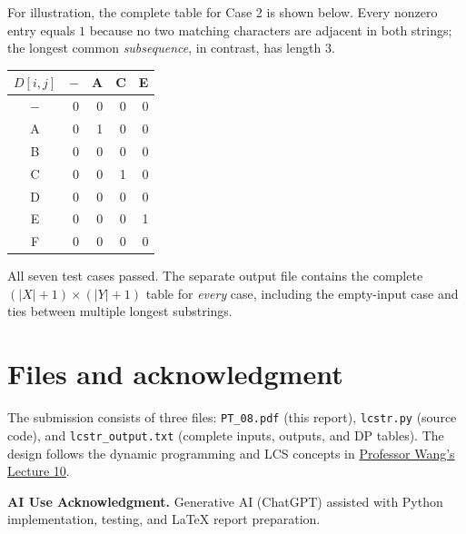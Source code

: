 \documentclass[11pt,a4paper]{article}
\newcommand{\code}[1]{\texttt{#1}}
\begin{document}
For illustration, the complete table for Case 2 is shown below. Every
nonzero entry equals $1$ because no two matching characters are adjacent in
both strings; the longest common \emph{subsequence}, in contrast, has length $3$.
\begin{center}
\small
\renewcommand{\arraystretch}{1.05}
\begin{tabular}{c|rrrr}
 $D[i,j]$ & $-$ & A & C & E\\\hline
 $-$ & 0 & 0 & 0 & 0\\
 A & 0 & 1 & 0 & 0\\
 B & 0 & 0 & 0 & 0\\
 C & 0 & 0 & 1 & 0\\
 D & 0 & 0 & 0 & 0\\
 E & 0 & 0 & 0 & 1\\
 F & 0 & 0 & 0 & 0
\end{tabular}
\end{center}
All seven test cases passed. The separate output file contains the complete
$(|X|+1)\times(|Y|+1)$ table for \emph{every} case, including the empty-input
case and ties between multiple longest substrings.

\section*{Files and acknowledgment}
The submission consists of three files:
\code{PT\_08.pdf} (this report), \code{lcstr.py} (source code), and
\code{lcstr\_output.txt} (complete inputs, outputs, and DP tables).
The design follows the dynamic programming and LCS concepts in
\href{https://cis.temple.edu/~pwang/5511-PT/Lecture/5511-10.htm}{Professor Wang's Lecture 10}.

\textbf{AI Use Acknowledgment.} Generative AI (ChatGPT) assisted with Python
implementation, testing, and LaTeX report preparation.
\end{document}
